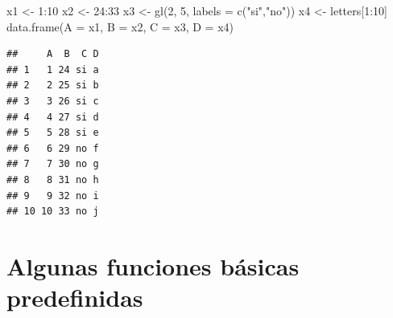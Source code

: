 \documentclass[
]{book}
\newenvironment{Shaded}{\begin{snugshade}}{\end{snugshade}}
\newcommand{\AttributeTok}[1]{\textcolor[rgb]{0.77,0.63,0.00}{#1}}
\newcommand{\DecValTok}[1]{\textcolor[rgb]{0.00,0.00,0.81}{#1}}
\newcommand{\FunctionTok}[1]{\textcolor[rgb]{0.00,0.00,0.00}{#1}}
\newcommand{\NormalTok}[1]{#1}
\newcommand{\OtherTok}[1]{\textcolor[rgb]{0.56,0.35,0.01}{#1}}
\newcommand{\SpecialCharTok}[1]{\textcolor[rgb]{0.00,0.00,0.00}{#1}}
\newcommand{\StringTok}[1]{\textcolor[rgb]{0.31,0.60,0.02}{#1}}
\begin{document}
\begin{Shaded}
\begin{Highlighting}[]
\NormalTok{x1 }\OtherTok{\textless{}{-}} \DecValTok{1}\SpecialCharTok{:}\DecValTok{10}
\NormalTok{x2 }\OtherTok{\textless{}{-}} \DecValTok{24}\SpecialCharTok{:}\DecValTok{33}
\NormalTok{x3 }\OtherTok{\textless{}{-}} \FunctionTok{gl}\NormalTok{(}\DecValTok{2}\NormalTok{, }\DecValTok{5}\NormalTok{, }\AttributeTok{labels =} \FunctionTok{c}\NormalTok{(}\StringTok{"si"}\NormalTok{,}\StringTok{"no"}\NormalTok{))}
\NormalTok{x4 }\OtherTok{\textless{}{-}}\NormalTok{ letters[}\DecValTok{1}\SpecialCharTok{:}\DecValTok{10}\NormalTok{]}
\FunctionTok{data.frame}\NormalTok{(}\AttributeTok{A =}\NormalTok{ x1, }\AttributeTok{B =}\NormalTok{ x2, }\AttributeTok{C =}\NormalTok{ x3, }\AttributeTok{D =}\NormalTok{ x4)}
\end{Highlighting}
\end{Shaded}

\begin{verbatim}
##     A  B  C D
## 1   1 24 si a
## 2   2 25 si b
## 3   3 26 si c
## 4   4 27 si d
## 5   5 28 si e
## 6   6 29 no f
## 7   7 30 no g
## 8   8 31 no h
## 9   9 32 no i
## 10 10 33 no j
\end{verbatim}

\hypertarget{algunas-funciones-buxe1sicas-predefinidas}{%
\section{Algunas funciones básicas predefinidas}\label{algunas-funciones-buxe1sicas-predefinidas}}
\end{document}
